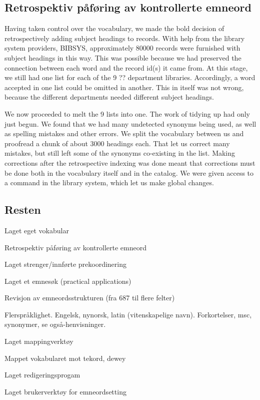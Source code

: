 \subsection{Retrospektiv påføring av kontrollerte emneord}

Having taken control over the vocabulary, we made the bold decision of retrospectively adding subject headings to records. With help from the library system providers, BIBSYS, approximately 80000 records were furnished with subject headings in this way. This was possible because we had preserved the connection between each word and the record id(s) it came from. At this stage, we still had one list for each of the 9 ?? department libraries. Accordingly, a word accepted in one list could be omitted in another. This in itself was not wrong, because the different departments needed different subject headings. 

We now proceeded to melt the 9 lists into one. The work of tidying up had only just begun. We found that we had many undetected synonyms being used, as well as spelling mistakes and other errors. We split the vocabulary between us and proofread a chunk of about 3000 headings each. That let us correct many mistakes, but still left some of the synonyms co-existing in the list. Making corrections after the retrospective indexing was done meant that corrections must be done both in the vocabulary itself and in the catalog. We were given access to a command in the library system, which let us make global changes. 

\subsection{Resten}

Laget eget vokabular

Retrospektiv påføring av kontrollerte emneord

Laget strenger/innførte prekoordinering

Laget et emnesøk (practical applications)

Revisjon av emneordsstrukturen (fra 687 til flere felter)

Flerspråklighet. Engelsk, nynorsk, latin (vitenskapelige navn). Forkortelser, msc, 
synonymer, se også-henvisninger. 

Laget mappingverktøy

Mappet vokabularet mot tekord, dewey

Laget redigeringsprogam 

Laget brukerverktøy for emneordsetting

